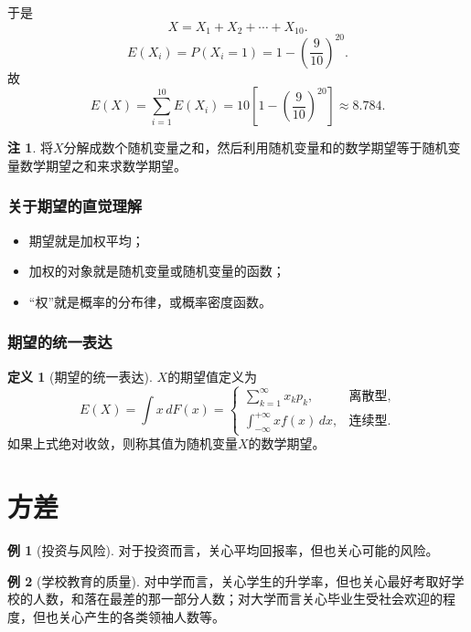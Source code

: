 \documentclass[11pt,a4paper]{report}
\theoremstyle{definition}
\newtheorem{definition}{定义}[chapter]
\newtheorem{example}{例}[chapter]
\newtheorem{note}{注}[chapter]
\begin{document}
于是
\[
X=X_{1}+X_{2}+\cdots+X_{10}.
\]
\[
E(X_{i})=P(X_{i}=1)=1-\left(\frac{9}{10}\right)^{20}.
\]
故
\[
E(X)=\sum_{i=1}^{10}E(X_{i})=10\left[1-\left(\frac{9}{10}\right)^{20}\right]\approx 8.784.
\]

\begin{note}
将$X$分解成数个随机变量之和，然后利用随机变量和的数学期望等于随机变量数学期望之和来求数学期望。
\end{note}

\subsubsection*{关于期望的直觉理解}

\begin{itemize}[leftmargin=2em]
    \item 期望就是加权平均；
    \item 加权的对象就是随机变量或随机变量的函数；
    \item ``权''就是概率的分布律，或概率密度函数。
\end{itemize}

\subsubsection*{期望的统一表达}

\begin{definition}[期望的统一表达]
$X$的期望值定义为
\[
E(X)=\int x\,dF(x)=
\begin{cases}
\sum_{k=1}^{\infty}x_{k}p_{k}, & \text{离散型},\\[0.5em]
\int_{-\infty}^{+\infty}xf(x)\,dx, & \text{连续型}.
\end{cases}
\]
如果上式绝对收敛，则称其值为随机变量$X$的数学期望。
\end{definition}

\section{方差}

\begin{example}[投资与风险]
对于投资而言，关心平均回报率，但也关心可能的风险。
\end{example}

\begin{example}[学校教育的质量]
对中学而言，关心学生的升学率，但也关心最好考取好学校的人数，和落在最差的那一部分人数；对大学而言关心毕业生受社会欢迎的程度，但也关心产生的各类领袖人数等。
\end{example}
\end{document}
